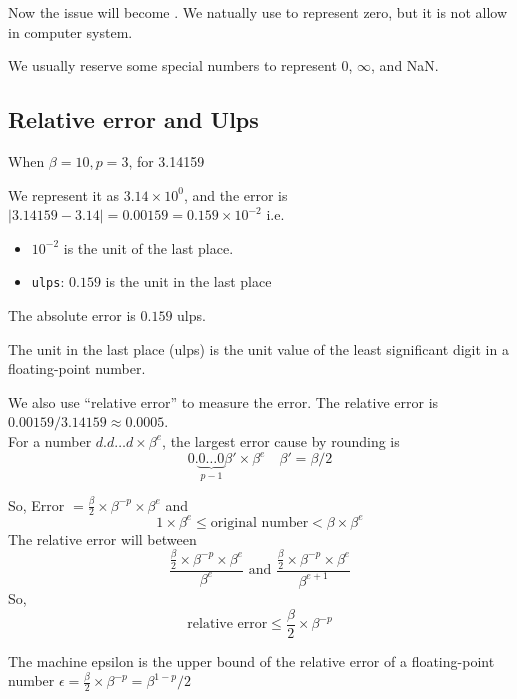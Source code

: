 Now the issue will become . We natually use  to represent zero, but it is not allow in computer system.

\begin{remark}
    We usually reserve some special numbers to represent $0$, $\infty$, and NaN.
\end{remark}

\subsection{Relative error and Ulps}

\begin{eg}
    When $\beta = 10, p = 3$, for 3.14159
\end{eg}

We represent it as $3.14 \times 10^{0}$, and the error is $|3.14159 - 3.14| = 0.00159 = 0.159 \times 10^{-2}$ i.e. 
\begin{itemize}
    \item $10^{-2}$ is the unit of the last place.
    \item \texttt{ulps}: $0.159$ is the unit in the last place
\end{itemize}
The absolute error is $0.159$ ulps.

\begin{definition}[ulps]
    The unit in the last place (ulps) is the unit value of the least significant digit in a floating-point number.
\end{definition}

We also use ``relative error'' to measure the error. The relative error is $0.00159/3.14159 \approx 0.0005$.\\ 
For a number $d.d\ldots d \times \beta^{e}$, the largest error cause by rounding is 
\[
    0. \underbrace{0\ldots 0}_{p-1}\beta' \times \beta^{e}\quad \beta' = \beta/2
\]

So, Error $= \frac{\beta}{2} \times \beta^{-p} \times \beta^{e}$ and 
\[
    1 \times \beta^{e} \leq \text{original number} < \beta \times \beta^{e}
\]
The relative error will between \[
    \frac{\frac{\beta}{2} \times \beta^{-p} \times \beta^{e}}{\beta^{e}} \text{ and } \frac{\frac{\beta}{2} \times \beta^{-p} \times \beta^{e}}{\beta^{e+1}}
\]
So, \[
    \text{relative error} \leq \frac{\beta}{2} \times \beta^{-p} \tag{1.1.1}
\]

\begin{definition}
    The machine epsilon is the upper bound of the relative error of a floating-point number $\epsilon = \frac{\beta}{2} \times \beta^{-p} = \beta^{1-p}/2$
\end{definition}

